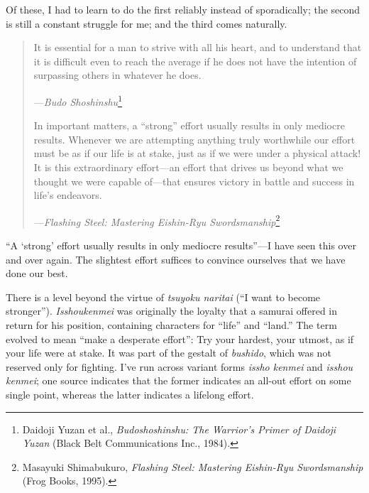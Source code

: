 {
 Of these, I had to learn to do the first reliably instead of
sporadically; the second is still a constant struggle for me; and the
third comes naturally.}

\myendsectiontext


\begin{quote}
{
 It is essential for a man to strive with all his heart, and to
understand that it is difficult even to reach the average if he does
not have the intention of surpassing others in whatever he does.}

{\raggedleft
 {}---\textit{Budo Shoshinshu}\footnote{Daidoji Yuzan et al., \textit{Budoshoshinshu: The
Warrior's Primer of Daidoji Yuzan} (Black Belt
Communications Inc., 1984).}
\par}


{
 In important matters, a
``strong'' effort usually results in
only mediocre results. Whenever we are attempting anything truly
worthwhile our effort must be as if our life is at stake, just as if we
were under a physical attack! It is this extraordinary effort---an
effort that drives us beyond what we thought we were capable of---that
ensures victory in battle and success in life's
endeavors.}

{\raggedleft
 {}---\textit{Flashing Steel: Mastering Eishin-Ryu
Swordsmanship}\footnote{Masayuki Shimabukuro, \textit{Flashing Steel: Mastering
Eishin-Ryu Swordsmanship} (Frog Books, 1995).}
\par}
\end{quote}

{
 ``A `strong'
effort usually results in only mediocre results''---I
have seen this over and over again. The slightest effort suffices to
convince ourselves that we have done our best.}

{
 There is a level beyond the virtue of \textit{tsuyoku naritai}
(``I want to become stronger'').
\textit{Isshoukenmei} was originally the loyalty that a samurai offered
in return for his position, containing characters for
``life'' and
``land.'' The term evolved to mean
``make a desperate effort'': Try
your hardest, your utmost, as if your life were at stake. It was part
of the gestalt of \textit{bushido}, which was not reserved only for
fighting. I've run across variant forms \textit{issho
kenmei} and \textit{isshou kenmei}; one source indicates that the
former indicates an all-out effort on some single point, whereas the
latter indicates a lifelong effort.}

